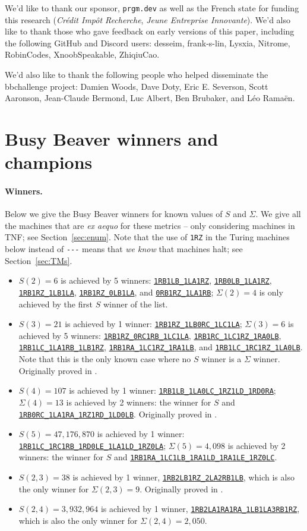 \documentclass[a4paper,british]{article}
\theoremstyle{definition} %
\numberwithin{equation}{section}
\theoremstyle{definition} %
\newcommand{\tm}[1]{\href{https://bbchallenge.org/#1}{\texttt{\nolinkurl{#1}}}}
\newcommand{\BBtheFifth}{47{,}176{,}870}
\newcommand{\BBTxF}{3{,}932{,}964}
\begin{document}
We'd like to thank our sponsor, \texttt{prgm.dev} as well as the French state for funding this research (\textit{Crédit Impôt Recherche}, \textit{Jeune Entreprise Innovante}). We'd also like to thank those who gave feedback on early versions of this paper, including the following GitHub and Discord users: desseim, frank-s-lin, Lysxia, Nitrome, RobinCodes, XnoobSpeakable, ZhiqiuCao.

We'd also like to thank the following people who helped disseminate the bbchallenge project: Damien Woods, Dave Doty, Eric E. Severson, Scott Aaronson, Jean-Claude Bermond, Luc Albert, Ben Brubaker, and Léo Ramaën.

\newpage

\vspace*{-5em}
\section{Busy Beaver winners and champions}\label{app:lowerbounds}

\paragraph{Winners.} Below we give the Busy Beaver winners for known values of $S$ and $\Sigma$. We give all the machines that are \textit{ex aequo} for these metrics -- only considering machines in TNF; see Section~\ref{sec:enum}. Note that the use of \texttt{1RZ} in the Turing machines below instead of \verb|---| means that \textit{we know} that machines halt; see Section~\ref{sec:TMs}.
\begin{itemize}
    \item $S(2) = 6$ is achieved by 5 winners: \tm{1RB1LB_1LA1RZ}, \tm{1RB0LB_1LA1RZ}, \tm{1RB1RZ_1LB1LA}, \tm{1RB1RZ_0LB1LA}, and \tm{0RB1RZ_1LA1RB}; $\Sigma(2) = 4$ is only achieved by the first $S$ winner of the list.
    \item $S(3) = 21$ is achieved by 1 winner: \tm{1RB1RZ_1LB0RC_1LC1LA}; $\Sigma(3) = 6$ is achieved by 5 winners: \tm{1RB1RZ_0RC1RB_1LC1LA}, \tm{1RB1RC_1LC1RZ_1RA0LB}, \tm{1RB1LC_1LA1RB_1LB1RZ}, \tm{1RB1RA_1LC1RZ_1RA1LB}, and \tm{1RB1LC_1RC1RZ_1LA0LB}. Note that this is the only known case where no $S$ winner is a $\Sigma$ winner. Originally proved in \cite{Lin1963}.
    \item $S(4) = 107$ is achieved by 1 winner: \tm{1RB1LB_1LA0LC_1RZ1LD_1RD0RA}; $\Sigma(4) = 13$ is achieved by 2 winners: the winner for $S$ and \tm{1RB0RC_1LA1RA_1RZ1RD_1LD0LB}. Originally proved in \cite{Brady83}.
    \item $S(5) = \BBtheFifth$ is achieved by 1 winner: \tm{1RB1LC_1RC1RB_1RD0LE_1LA1LD_1RZ0LA}; $\Sigma(5) = 4{,}098$ is achieved by 2 winners: the winner for $S$ and \tm{1RB1RA_1LC1LB_1RA1LD_1RA1LE_1RZ0LC}.
    \item $S(2,3) = 38$ is achieved by 1 winner, \tm{1RB2LB1RZ_2LA2RB1LB}, which is also the only winner for $\Sigma(2,3) = 9$. Originally proved in \cite{LafittePapazian2007}.
    \item $S(2,4) = \BBTxF$ is achieved by 1 winner, \tm{1RB2LA1RA1RA_1LB1LA3RB1RZ}, which is also the only winner for $\Sigma(2,4)=2{,}050$.
\end{itemize}
\end{document}
